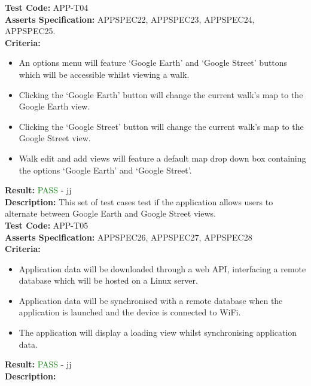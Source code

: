 \documentclass[11pt,a4paper]{report}
\begin{document}
\label{test:APP-T04}
\noindent\textbf{Test Code:} APP-T04\\
\textbf{Asserts Specification:} APPSPEC22, APPSPEC23, APPSPEC24, APPSPEC25.\\ 
\textbf{Criteria:} \begin{itemize}
                     \item An options menu will feature `Google Earth' and `Google Street' buttons which will be accessible whilst viewing a walk.
                     \item Clicking the `Google Earth' button will change the current walk's map to the Google Earth view.
                     \item Clicking the `Google Street' button will change the current walk's map to the Google Street view.
                     \item Walk edit and add views will feature a default map drop down box containing
                     the options `Google Earth' and `Google Street'.
                   \end{itemize}
\textbf{Result:} \textcolor{green}{PASS} - jj\\
\textbf{Description:} This set of test cases test if the application allows users to alternate between Google Earth and Google Street views.\\

\label{test:APP-T05}
\noindent\textbf{Test Code:} APP-T05\\
\textbf{Asserts Specification:} APPSPEC26, APPSPEC27, APPSPEC28\\ 
\textbf{Criteria:} \begin{itemize}
                     \item Application data will be downloaded through a web API, interfacing a remote database which will be hosted on a Linux server.
                     \item Application data will be synchronised with a remote database when the application is launched and the device is connected to WiFi.
                     \item The application will display a loading view whilst synchronising application data.
                   \end{itemize}
\textbf{Result:} \textcolor{green}{PASS} - jj\\
\textbf{Description:} \\
\end{document}
